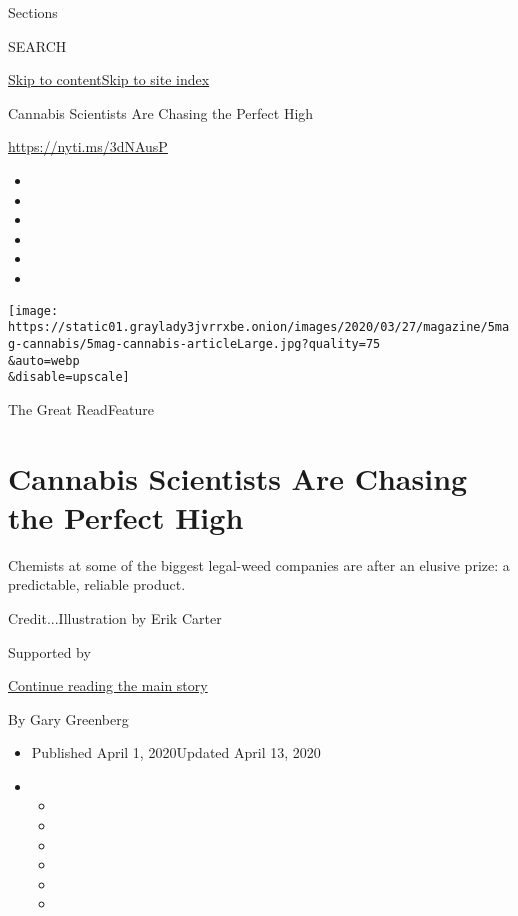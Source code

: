 Sections

SEARCH

\protect\hyperlink{site-content}{Skip to
content}\protect\hyperlink{site-index}{Skip to site index}

Cannabis Scientists Are Chasing the Perfect High

\url{https://nyti.ms/3dNAusP}

\begin{itemize}
\item
\item
\item
\item
\item
\item
\end{itemize}

\texttt{[image: https://static01.graylady3jvrrxbe.onion/images/2020/03/27/magazine/5mag-cannabis/5mag-cannabis-articleLarge.jpg?quality=75\\\&auto=webp\\\&disable=upscale]}

The Great ReadFeature

\hypertarget{cannabis-scientists-are-chasing-the-perfect-high}{%
\section{Cannabis Scientists Are Chasing the Perfect
High}\label{cannabis-scientists-are-chasing-the-perfect-high}}

Chemists at some of the biggest legal-weed companies are after an
elusive prize: a predictable, reliable product.

Credit...Illustration by Erik Carter

Supported by

\protect\hyperlink{after-sponsor}{Continue reading the main story}

By Gary Greenberg

\begin{itemize}
\item
  Published April 1, 2020Updated April 13, 2020
\item
  \begin{itemize}
  \item
  \item
  \item
  \item
  \item
  \item
  \end{itemize}
\end{itemize}

